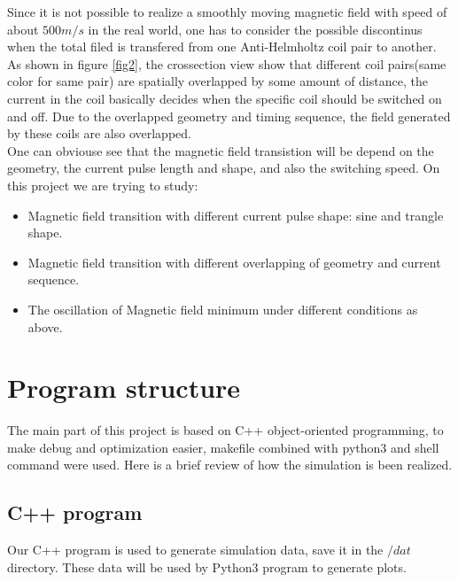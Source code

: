 \documentclass[11pt, xcolor=dvipsnames]{article}
\begin{document}
Since it is not possible to realize a smoothly moving magnetic field with speed of about $500 m/s$ in the real world, one has to consider the possible discontinus when the total filed is transfered from one Anti-Helmholtz coil pair to another. As shown in figure \ref{fig2}, the crossection view show that different coil pairs(same color for same pair) are spatially overlapped by some amount of distance, the current in the coil basically decides when the specific coil should be switched on and off. Due to the overlapped geometry and timing sequence, the field generated by these coils are also overlapped.\\

One can obviouse see that the magnetic field transistion will be depend on the geometry, the current pulse length and shape, and also the switching speed. On this project we are trying to study:\begin{itemize} \item  Magnetic field transition with different current pulse shape: sine and trangle shape. \item Magnetic field transition with different overlapping of geometry and current sequence.\item The oscillation of Magnetic field minimum under different conditions as above.\end{itemize}

\section{Program structure}
The main part of this project is based on C++ object-oriented programming, to make debug and optimization easier, makefile combined with python3 and shell command were used. Here is a brief review of how the simulation is been realized. \\
\subsection{C++ program}
Our C++ program is used to generate simulation data, save it in the $/dat$ directory. These data will be used by Python3 program to generate plots.\\
\end{document}
